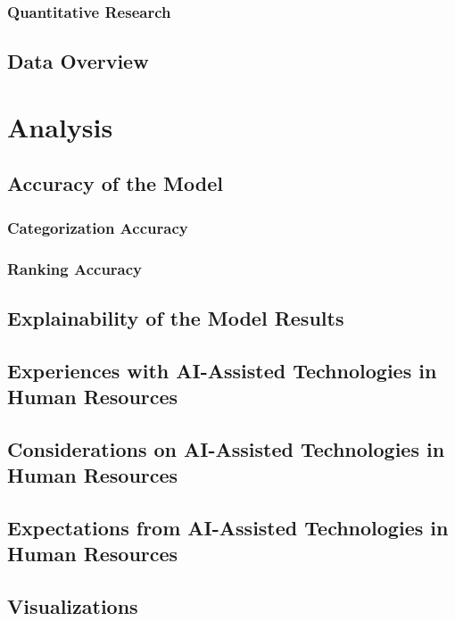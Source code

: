 \documentclass[draft,final]{thesisclass} %
\begin{document}
\subsection{Quantitative Research}

\section{Data Overview}
\lipsum[1]

\chapter{Analysis}

\section{Accuracy of the Model}

\subsection{Categorization Accuracy}
\lipsum[1]

\subsection{Ranking Accuracy}
\lipsum[1]

\section{Explainability of the Model Results}
\lipsum[1]

\section{Experiences with \acs{AI}-Assisted Technologies in Human Resources}
\lipsum[1]

\section{Considerations on \acs{AI}-Assisted Technologies in Human Resources}
\lipsum[1]

\section{Expectations from \acs{AI}-Assisted Technologies in Human Resources}
\lipsum[1]

\section{Visualizations}
\lipsum[1]
\end{document}
